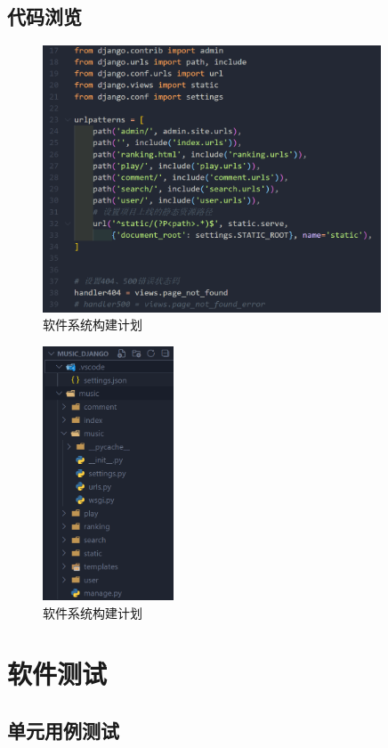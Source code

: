 \documentclass[UTF8,14pt]{article}
\numberwithin{figure}{subsubsection}
\numberwithin{table}{subsubsection}
\begin{document}
\subsection{代码浏览}
\begin{minipage}[t]{0.7\linewidth}
	\begin{figure}[H]
		\includegraphics[width=10.06cm,height=7.92cm]{figures/index.png}
		\caption{软件系统构建计划}
	\end{figure}
\end{minipage}
\hfill
\begin{minipage}[t]{0.28\linewidth}
	\begin{figure}[H]
		\centering
		\includegraphics[width=3.90cm,height=7.55cm]{figures/3.png}
		\caption{软件系统构建计划}
	\end{figure}
\end{minipage}

\section{软件测试}
\subsection{单元用例测试}
\end{document}

